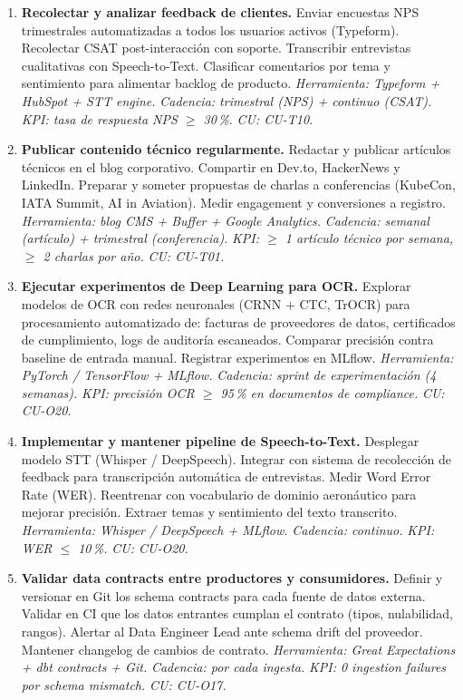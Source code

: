 ﻿\documentclass[11pt, letterpaper]{article}
\begin{document}
\begin{enumerate}[leftmargin=1.5cm, label=\textbf{OP\arabic*}, itemsep=2pt, topsep=4pt]
    \item \textbf{Recolectar y analizar feedback de clientes.} Enviar encuestas NPS trimestrales automatizadas a todos los usuarios activos (Typeform). Recolectar CSAT post-interacción con soporte. Transcribir entrevistas cualitativas con Speech-to-Text. Clasificar comentarios por tema y sentimiento para alimentar backlog de producto. \textit{Herramienta: Typeform + HubSpot + STT engine.} \textit{Cadencia: trimestral (NPS) + continuo (CSAT).} \textit{KPI: tasa de respuesta NPS $\geq$ 30\,\%.} \textit{CU: CU-T10.}



    \item \textbf{Publicar contenido técnico regularmente.} Redactar y publicar artículos técnicos en el blog corporativo. Compartir en Dev.to, HackerNews y LinkedIn. Preparar y someter propuestas de charlas a conferencias (KubeCon, IATA Summit, AI in Aviation). Medir engagement y conversiones a registro. \textit{Herramienta: blog CMS + Buffer + Google Analytics.} \textit{Cadencia: semanal (artículo) + trimestral (conferencia).} \textit{KPI: $\geq$ 1 artículo técnico por semana, $\geq$ 2 charlas por año.} \textit{CU: CU-T01.}



    \item \textbf{Ejecutar experimentos de Deep Learning para OCR.} Explorar modelos de OCR con redes neuronales (CRNN + CTC, TrOCR) para procesamiento automatizado de: facturas de proveedores de datos, certificados de cumplimiento, logs de auditoría escaneados. Comparar precisión contra baseline de entrada manual. Registrar experimentos en MLflow. \textit{Herramienta: PyTorch / TensorFlow + MLflow.} \textit{Cadencia: sprint de experimentación (4 semanas).} \textit{KPI: precisión OCR $\geq$ 95\,\% en documentos de compliance.} \textit{CU: CU-O20.}



    \item \textbf{Implementar y mantener pipeline de Speech-to-Text.} Desplegar modelo STT (Whisper / DeepSpeech). Integrar con sistema de recolección de feedback para transcripción automática de entrevistas. Medir Word Error Rate (WER). Reentrenar con vocabulario de dominio aeronáutico para mejorar precisión. Extraer temas y sentimiento del texto transcrito. \textit{Herramienta: Whisper / DeepSpeech + MLflow.} \textit{Cadencia: continuo.} \textit{KPI: WER $\leq$ 10\,\%.} \textit{CU: CU-O20.}



    \item \textbf{Validar data contracts entre productores y consumidores.} Definir y versionar en Git los schema contracts para cada fuente de datos externa. Validar en CI que los datos entrantes cumplan el contrato (tipos, nulabilidad, rangos). Alertar al Data Engineer Lead ante schema drift del proveedor. Mantener changelog de cambios de contrato. \textit{Herramienta: Great Expectations + dbt contracts + Git.} \textit{Cadencia: por cada ingesta.} \textit{KPI: 0 ingestion failures por schema mismatch.} \textit{CU: CU-O17.}

\end{enumerate}
\end{document}

